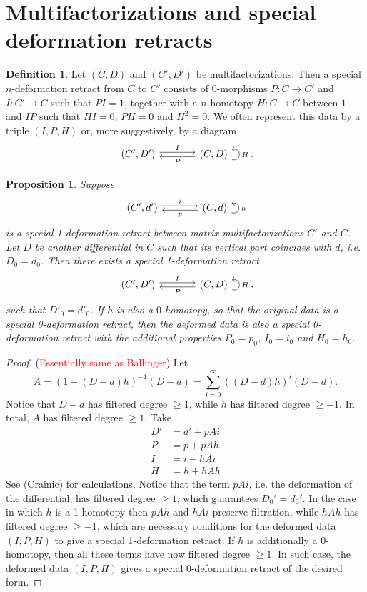 \documentclass{article}
\newcommand{\sdr}[5]{%
  \begin{tikzcd}[column sep=large, ampersand replacement=\&]
    {#1} \arrow[r, "#3", shift left=0.5ex,] \arrow[r, leftarrow, "#4", shift right=0.5ex, swap] \& 
    {#2} \arrow[loop right, distance=1em, in=15, out=-15, "#5",swap]
  \end{tikzcd}%
}
\theoremstyle{plain} %
\newtheorem{proposition}[theorem]{Proposition}
\theoremstyle{definition} %
\newtheorem{definition}[theorem]{Definition}
\theoremstyle{remark} %
\begin{document}
\section{Multifactorizations and special deformation retracts}
\begin{definition}
	Let $(C,D)$ and $(C',D')$ be multifactorizations. Then a special $n$-deformation retract from $C$ to $C'$ consists of 0-morphisms $P:C\to C'$ and $I:C'\to C$ such that $PI=1$, together with a $n$-homotopy $H:C\to C$ between $1$ and $IP$ such that $HI=0$, $PH=0$ and $H^2=0$. We often represent this data by a triple $(I,P,H)$ or, more suggestively, by a diagram
	$$
		\sdr{(C',D')}{(C,D)}{I}{P}{H}
		.
	$$
\end{definition}

\begin{proposition}\label{specialDefRetract}
	Suppose 
	$$\sdr{(C',d')}{(C,d)}{i}{p}{h}$$
	is a special 1-deformation retract between matrix multifactorizations $C'$ and $C$. Let $D$ be another differential in $C$ such that its vertical part coincides with $d$, i.e. $D_0=d_0$. Then there exists a special 1-deformation retract
	$$\sdr{(C',D')}{(C,D)}{I}{P}{H}.$$
	such that $D'_0=d'_0$.
	If $h$ is also a $0$-homotopy, so that the original data is a special 0-deformation retract, then the deformed data is also a special 0-deformation retract with the additional properties $P_0=p_0$, $I_0=i_0$ and $H_0=h_0$.
\end{proposition}


\begin{proof}(\textcolor{red}{Essentially same as Ballinger}) Let 
	$$A=(1-(D-d)h)^{-1}(D-d)=\sum_{i=0}^{\infty} ((D-d)h)^i(D-d). $$
	Notice that $D-d$ has filtered degree $\geq 1$, while $h$ has filtered degree $\geq -1$. In total, $A$ has filtered degree $\geq 1$.
	Take 
	\begin{equation}\label{eq:deformedsdrdata}
		\begin{aligned}
			D'&=d'+pAi
			\\
			P&=p+pAh
			\\
			I&=i+hAi
			\\
			H&=h+hAh
		\end{aligned}
	\end{equation}See (Crainic) for calculations. Notice that the term $pAi$, i.e. the deformation of the differential, has filtered degree $\geq 1$, which guarantees $D_0'=d_0'$. In the case in which $h$ is a 1-homotopy then $pAh$ and $hAi$ preserve filtration, while $hAh$ has filtered degree $\geq -1$, which are necessary conditions for the deformed data $(I,P,H)$ to give a special 1-deformation retract. If $h$ is additionally a 0-homotopy, then all these terms have now filtered degree $\geq 1$. In such case, the deformed data $(I,P,H)$ gives a special 0-deformation retract of the desired form.
\end{proof}
\end{document}
